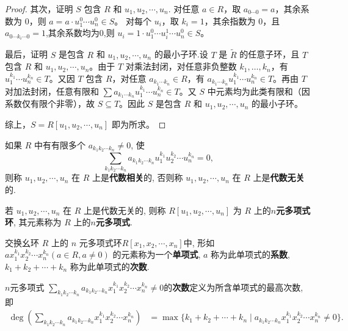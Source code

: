 \documentclass[../../main.tex]{subfiles}%
\begin{document}
\begin{proof}
其次，证明 \( S \) 包含 \( R \) 和 \( u_1, u_2, \cdots, u_n \).
对任意 \( a \in R \)，取 \( a_{0 \cdots 0} = a \)，其余系数为 0，则 \( a = a \cdot u_1^0 \cdots u_n^0 \in S \)。
对每个 \( u_i \)，取 \( k_i = 1 \)，其余指数为 0，且$a_{0\cdots k_i\cdots 0}=1$,其余系数均为0,则 \( u_i = 1 \cdot u_1^0 \cdots u_i^1 \cdots u_n^0 \in S \)。

最后，证明 \( S \) 是包含 \( R \) 和 \( u_1, u_2, \cdots, u_n \) 的最小子环.设 \( T \) 是 \( \widetilde{R} \) 的任意子环，且 \( T \) 包含 \( R \) 和 \( u_1, u_2, \cdots, u_n \)。由于 \( T \) 对乘法封闭，对任意非负整数 \( k_1, \ldots, k_n \)，有 \( u_1^{k_1} \cdots u_n^{k_n} \in T \)。又因 \( T \) 包含 \( R \)，对任意 \( a_{k_1 \cdots k_n} \in R \)，有 \( a_{k_1 \cdots k_n} u_1^{k_1} \cdots u_n^{k_n} \in T \)。再由 \( T \) 对加法封闭，任意有限和 \( \sum a_{k_1 \cdots k_n} u_1^{k_1} \cdots u_n^{k_n} \in T \)。又 \( S \) 中元素均为此类有限和（因系数仅有限个非零），故 \( S \subseteq T \)。因此 \( S \) 是包含 \( R \) 和 \( u_1, u_2, \cdots, u_n \) 的最小子环。

综上，\( S = R[u_1, u_2, \cdots, u_n] \) 即为所求。

\end{proof}

\begin{definition}
如果 \( R \) 中有有限多个 \( a_{k_1 k_2 \cdots k_n} \neq 0 \), 使
\[
\sum_{k_1 k_2 \cdots k_n} a_{k_1 k_2 \cdots k_n} u_1^{k_1} u_2^{k_2} \cdots u_n^{k_n} = 0,
\]
则称 \( u_1, u_2, \cdots, u_n \) 在 \( R \) 上是\textbf{代数相关}的, 否则称 \( u_1, u_2, \cdots, u_n \) 在 \( R \) 上是\textbf{代数无关}的.

若 \( u_1, u_2, \cdots, u_n \) 在 \( R \) 上是代数无关的, 则称 \( R[u_1, u_2, \cdots, u_n] \) 为 \( R \) 上的\textbf{$n$元多项式环}, 其元素称为 \( R \) 上的\textbf{$n$元多项式}.

交换幺环 \( R \) 上的 \( n \) 元多项式环\( R[x_1, x_2, \cdots, x_n] \)中, 形如 \( a x_1^{k_1} x_2^{k_2} \cdots x_n^{k_n} (a \in R, a \neq 0) \) 的元素称为一个\textbf{单项式}, \( a \) 称为此单项式的\textbf{系数}, \( k_1 + k_2 + \cdots + k_n \) 称为此单项式的\textbf{次数}.

$n$元多项式 \( \sum_{k_1 k_2 \cdots k_n} a_{k_1 k_2 \cdots k_n} x_1^{k_1} x_2^{k_2} \cdots x_n^{k_n} \neq 0 \)的\textbf{次数}定义为所含单项式的最高次数, 即
\begin{align*}
\deg \left( \sum_{k_1 k_2 \cdots k_n} a_{k_1 k_2 \cdots k_n} x_1^{k_1} x_2^{k_2} \cdots x_n^{k_n} \right) &= \max \{ k_1 + k_2 + \cdots + k_n \mid a_{k_1 k_2 \cdots k_n} x_1^{k_1} x_2^{k_2} \cdots x_n^{k_n} \neq 0 \}.
\end{align*}
\end{definition}
\end{document}
